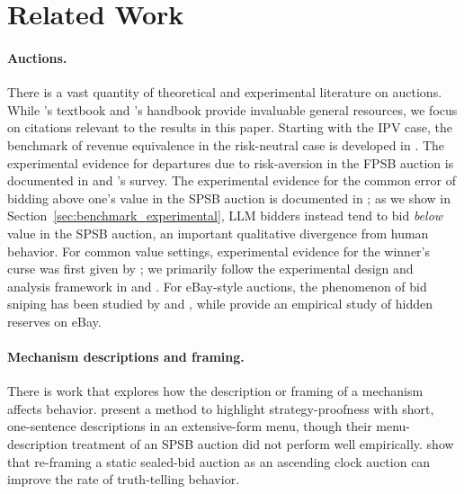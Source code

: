\section{Related Work}\label{sec:background}

\paragraph{Auctions.}
There is a vast quantity of theoretical and experimental literature on auctions. While \citet{krishna2009auction}'s textbook and \citet{kagel2020handbook}'s handbook provide invaluable general resources, we focus on citations relevant to the results in this paper.
Starting with the IPV case, the benchmark of revenue equivalence in the risk-neutral case is developed in \citet{myerson1981optimal}. The experimental evidence for departures due to risk-aversion in the FPSB auction is documented in \citet{coppinger1980incentives} and \citet{cox1988theory}'s survey. The experimental evidence for the common error of bidding above one's value in the SPSB auction is documented in \citet{kagel1993independent}; as we show in Section~\ref{sec:benchmark_experimental}, LLM bidders instead tend to bid \emph{below} value in the SPSB auction, an important qualitative divergence from human behavior.
For common value settings, experimental evidence for the winner's curse was first given by \citet{bazerman1983won}; we primarily follow the experimental design and analysis framework in \citet{kagel1986winner} and \citet{kagel1987information}. For eBay-style auctions, the phenomenon of bid sniping has been studied  by \citet{roth2002last} and \citet{ockenfels2006late}, while \citet{einav2011learning} provide an empirical study of hidden reserves on eBay. 

\paragraph{Mechanism descriptions and framing.} There is work that explores how the description or framing of a mechanism affects behavior. \citet{gonczarowski2023strategyproofness} present a method to highlight strategy-proofness with short, one-sentence descriptions in an extensive-form menu, though their menu-description treatment of an SPSB auction did not perform well empirically. \citet{breitmoser2022obviousness} show that re-framing a static sealed-bid auction as an ascending clock auction can improve the rate of truth-telling behavior.

